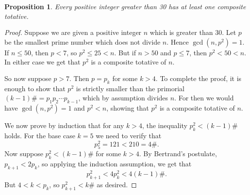 \documentclass[12pt]{article}
\newtheorem*{proposition*}{Proposition}
\begin{document}
\begin{proposition*}
Every positive integer greater than 30 has at least one composite
totative.
\end{proposition*}

\begin{proof}
Suppose we are given a positive integer $n$ which is greater than 30.
Let $p$ be the smallest prime number which does not divide $n$.  Hence
$\gcd(n,p^2) = 1$.  If $n\le 50$, then $p < 7$, so $p^2 \le 25 < n$.
But if $n>50$ and $p\le 7$, then $p^2 < 50 < n$.  In either case we
get that $p^2$ is a composite totative of $n$.

So now suppose $p > 7$.  Then $p = p_k$ for some $k>4$.  To complete
the proof, it is enough to show that $p^2$ is strictly smaller than
the primorial $(k-1)\# = p_1 p_2\cdots p_{k-1}$, which by assumption
divides $n$.  For then we would have $\gcd(n, p^2) = 1$ and $p^2 < n$,
showing that $p^2$ is a composite totative of $n$.

We now prove by induction that for any $k>4$, the inequality $p_k^2 <
(k-1)\#$ holds.  For the base case $k=5$ we need to verify that
\[
p_5^2 = 121 < 210 = 4\#.
\]
Now suppose $p_k^2 < (k-1)\#$ for some $k>4$.  By Bertrand's
postulate, $p_{k+1} < 2p_k$, so applying the induction assumption, we
get that
\[
p_{k+1}^2 < 4p_k^2 < 4(k-1)\#.
\]
But $4 < k < p_k$, so $p_{k+1}^2 < k\#$ as desired.
\end{proof}

\end{document}
